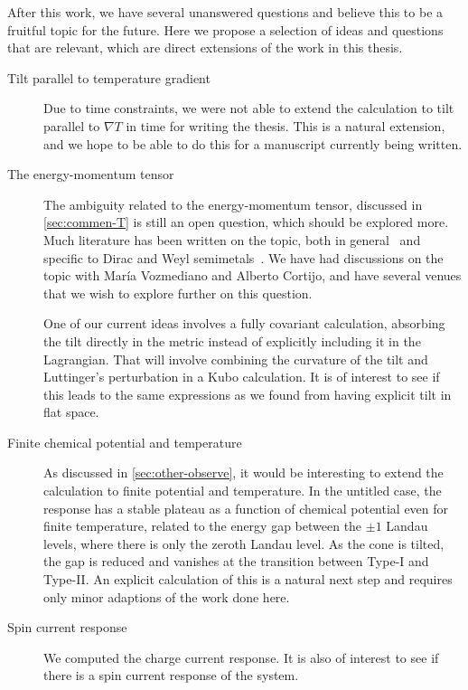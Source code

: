 After this work, we have several unanswered questions and believe this to be a fruitful topic for the future.
Here we propose a selection of ideas and questions that are relevant, which are direct extensions of the work in this thesis.
\begin{description}
  \item[Tilt parallel to temperature gradient]
        Due to time constraints, we were not able to extend the calculation to tilt parallel to \( \nabla T \) in time for writing the thesis.
        This is a natural extension, and we hope to be able to do this for a manuscript currently being written.

  \item[The energy-momentum tensor]
        The ambiguity related to the energy\hyp{}momentum tensor, discussed in \cref{sec:commen-T} is still an open question, which should be explored more.
        Much literature has been written on the topic, both in general~\cite{forgerCurrentsEnergyMomentumTensor2004} and specific to Dirac and Weyl semimetals~\cite{vanderwurffMagnetovorticalThermoelectricTransport2019,arjonaFingerprintsConformalAnomaly2019}.
        We have had discussions on the topic with María Vozmediano and Alberto Cortijo, and have several venues that we wish to explore further on this question.

        One of our current ideas involves a fully covariant calculation, absorbing the tilt directly in the metric instead of explicitly including it in the Lagrangian.
        That will involve combining the curvature of the tilt and Luttinger's perturbation in a Kubo calculation.
        It is of interest to see if this leads to the same expressions as we found from having explicit tilt in flat space.


  \item[Finite chemical potential and temperature]
        As discussed in \cref{sec:other-observe}, it would be interesting to extend the calculation to finite potential and temperature.
        In the untitled case, the response has a stable plateau as a function of chemical potential even for finite temperature, related to the energy gap between the \( \pm 1 \) Landau levels, where there is only the zeroth Landau level.
        As the cone is tilted, the gap is reduced and vanishes at the transition between Type-I and Type-II.
        An explicit calculation of this is a natural next step and requires only minor adaptions of the work done here.

  \item[Spin current response] We computed the charge current response.
        It is also of interest to see if there is a spin current response of the system.

\end{description}
